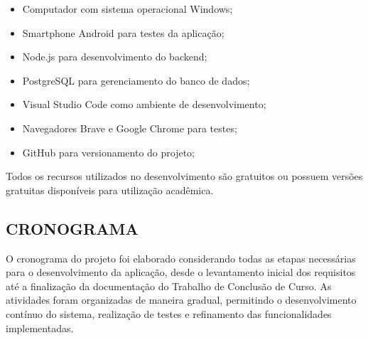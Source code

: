 \documentclass{UNESC}
\begin{document}
\begin{itemize}
    \item Computador com sistema operacional Windows;
    \item Smartphone Android para testes da aplicação;
    \item Node.js para desenvolvimento do backend;
    \item PostgreSQL para gerenciamento do banco de dados;
    \item Visual Studio Code como ambiente de desenvolvimento;
    \item Navegadores Brave e Google Chrome para testes;
    \item GitHub para versionamento do projeto;
\end{itemize}

Todos os recursos utilizados no desenvolvimento são gratuitos ou possuem versões gratuitas disponíveis para utilização acadêmica.

\subsection{CRONOGRAMA}

O cronograma do projeto foi elaborado considerando todas as etapas necessárias para o desenvolvimento da aplicação, desde o levantamento inicial dos requisitos até a finalização da documentação do Trabalho de Conclusão de Curso. As atividades foram organizadas de maneira gradual, permitindo o desenvolvimento contínuo do sistema, realização de testes e refinamento das funcionalidades implementadas.

\renewcommand{\tablename}{Quadro}
\setcounter{table}{0}
\end{document}

